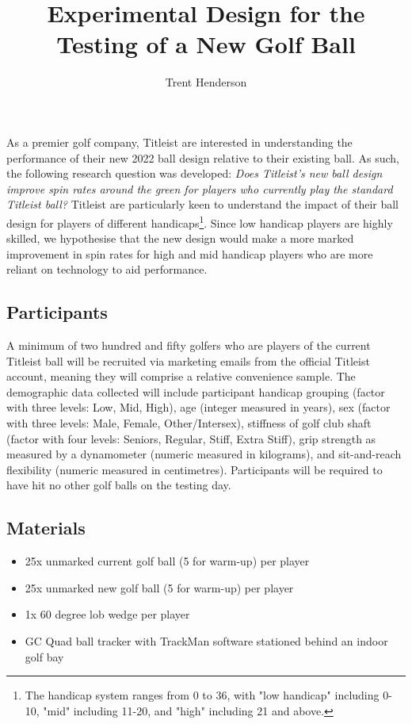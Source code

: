 \documentclass{article}
\begin{document}
\title{\vspace{-4cm}Experimental Design for the Testing of a New Golf Ball}
\author{Trent Henderson}
\date{}

\maketitle

As a premier golf company, Titleist are interested in understanding the performance of their new 2022 ball design relative to their existing ball. 
As such, the following research question was developed: \textit{Does Titleist's new ball design improve spin rates around the green for players who currently play the standard Titleist ball?} 
Titleist are particularly keen to understand the impact of their ball design for players of different handicaps\footnote{The handicap system ranges from 0 to 36, with "low handicap" including 0-10, "mid" including 11-20, and "high" including 21 and above.}. 
Since low handicap players are highly skilled, we hypothesise that the new design would make a more marked improvement in spin rates for high and mid handicap players who are more reliant on technology to aid performance.

\subsection*{Participants}

A minimum of two hundred and fifty golfers who are players of the current Titleist ball will be recruited via marketing emails from the official Titleist account, meaning they will comprise a relative convenience sample. 
The demographic data collected will include participant handicap grouping (factor with three levels: Low, Mid, High), age (integer measured in years), sex (factor with three levels: Male, Female, Other/Intersex), stiffness of golf club shaft (factor with four levels: Seniors, Regular, Stiff, Extra Stiff), grip strength as measured by a dynamometer (numeric measured in kilograms), and sit-and-reach flexibility (numeric measured in centimetres).
Participants will be required to have hit no other golf balls on the testing day.

\subsection*{Materials}

\begin{itemize}
    \item 25x unmarked current golf ball (5 for warm-up) per player
    \item 25x unmarked new golf ball (5 for warm-up) per player
    \item 1x 60 degree lob wedge per player
    \item GC Quad ball tracker with TrackMan software stationed behind an indoor golf bay
\end{itemize}
\end{document}
